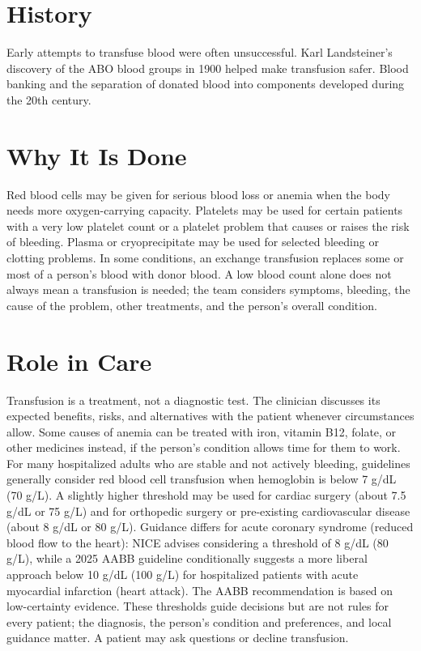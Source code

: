 \section*{History}
Early attempts to transfuse blood were often unsuccessful. Karl Landsteiner's discovery of the ABO blood groups in 1900 helped make transfusion safer. Blood banking and the separation of donated blood into components developed during the 20th century.

\section*{Why It Is Done}
Red blood cells may be given for serious blood loss or anemia when the body needs more oxygen-carrying capacity. Platelets may be used for certain patients with a very low platelet count or a platelet problem that causes or raises the risk of bleeding. Plasma or cryoprecipitate may be used for selected bleeding or clotting problems. In some conditions, an exchange transfusion replaces some or most of a person's blood with donor blood. A low blood count alone does not always mean a transfusion is needed; the team considers symptoms, bleeding, the cause of the problem, other treatments, and the person's overall condition.

\section*{Role in Care}
Transfusion is a treatment, not a diagnostic test. The clinician discusses its expected benefits, risks, and alternatives with the patient whenever circumstances allow. Some causes of anemia can be treated with iron, vitamin B12, folate, or other medicines instead, if the person's condition allows time for them to work. For many hospitalized adults who are stable and not actively bleeding, guidelines generally consider red blood cell transfusion when hemoglobin is below 7 g/dL (70 g/L). A slightly higher threshold may be used for cardiac surgery (about 7.5 g/dL or 75 g/L) and for orthopedic surgery or pre-existing cardiovascular disease (about 8 g/dL or 80 g/L). Guidance differs for acute coronary syndrome (reduced blood flow to the heart): NICE advises considering a threshold of 8 g/dL (80 g/L), while a 2025 AABB guideline conditionally suggests a more liberal approach below 10 g/dL (100 g/L) for hospitalized patients with acute myocardial infarction (heart attack). The AABB recommendation is based on low-certainty evidence. These thresholds guide decisions but are not rules for every patient; the diagnosis, the person's condition and preferences, and local guidance matter. A patient may ask questions or decline transfusion.


